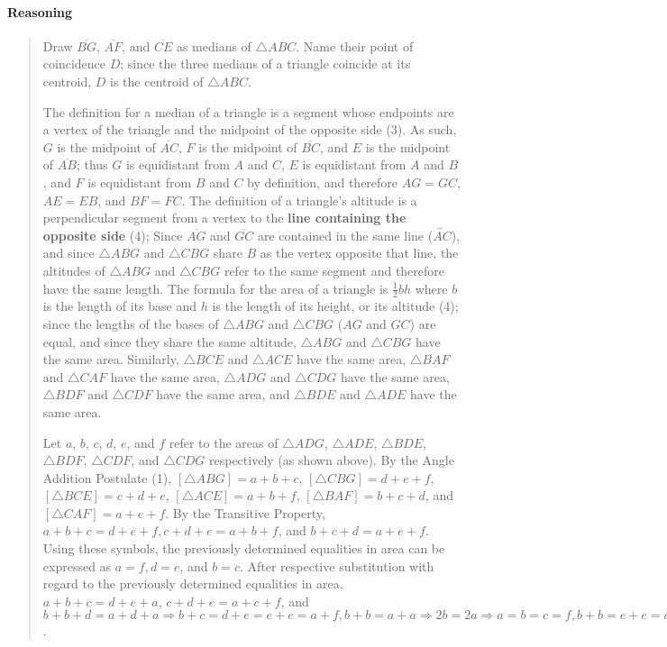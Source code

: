 \documentclass[letterpaper,12pt,twoside]{report}
\begin{document}
	\paragraph{Reasoning}
	\begin{quotation}
		
		Draw $\overline{BG}$, $\overline{AF}$, and $\overline{CE}$ as medians of $\triangle ABC$. Name their point of coincidence $D$; since the three medians of a triangle coincide at its centroid, $D$ is the centroid of $\triangle ABC$.
		
		The definition for a median of a triangle is a segment whose endpoints are a vertex of the triangle and the midpoint of the opposite side (3). As such, $G$ is the midpoint of $\overline{AC}$, $F$ is the midpoint of $\overline{BC}$, and $E$ is the midpoint of $\overline{AB}$; thus $G$ is equidistant from $A$ and $C$, $E$ is equidistant from $A$ and $B$, and $F$ is equidistant from $B$ and $C$ by definition, and therefore $AG=GC$, $AE=EB$, and $BF=FC$. The definition of a triangle's altitude is a perpendicular segment from a vertex to the \textbf{line containing the opposite side} (4); Since $\overline{AG}$ and $\overline{GC}$ are contained in the same line ($\overleftrightarrow{AC}$), and since $\triangle ABG$ and $\triangle CBG$ share $B$ as the vertex opposite that line, the altitudes of $\triangle ABG$ and $\triangle CBG$ refer to the same segment and therefore have the same length. The formula for the area of a triangle is $\frac{1}{2}bh$ where $b$ is the length of its base and $h$ is the length of its height, or its altitude (4); since the lengths of the bases of $\triangle ABG$ and $\triangle CBG$ ($AG$ and $GC$) are equal, and since they share the same altitude, $\triangle ABG$ and $\triangle CBG$ have the same area. Similarly, $\triangle BCE$ and $\triangle ACE$ have the same area, $\triangle BAF$ and $\triangle CAF$ have the same area, $\triangle ADG$ and $\triangle CDG$ have the same area, $\triangle BDF$ and $\triangle CDF$ have the same area, and $\triangle BDE$ and $\triangle ADE$ have the same area.
				
		Let $a$, $b$, $c$, $d$, $e$, and $f$ refer to the areas of $\triangle ADG$, $\triangle ADE$, $\triangle BDE$, $\triangle BDF$, $\triangle CDF$, and $\triangle CDG$ respectively (as shown above). By the Angle Addition Postulate (1), $[\triangle ABG]=a+b+c$, $[\triangle CBG]=d+e+f$, $[\triangle BCE]=c+d+e$, $[\triangle ACE]=a+b+f$, $[\triangle BAF]=b+c+d$, and $[\triangle CAF]=a+e+f$. By the Transitive Property, $a+b+c=d+e+f, c+d+e=a+b+f$, and $b+c+d=a+e+f$. Using these symbols, the previously determined equalities in area can be expressed as $a=f, d=e$, and $b=c$. After respective substitution with regard to the previously determined equalities in area, $a+b+c=d+e+a$, $c+d+e=a+c+f$, and $b+b+d=a+d+a \Rightarrow b+c=d+e=e+e=a+f, b+b=a+a \Rightarrow 2b=2a \Rightarrow a=b=c=f, b+b=e+e=d+e=a+a \Rightarrow 2b=2e=2a \Rightarrow a=b=c=f=e=d$.
		

\end{quotation}
\end{document}
